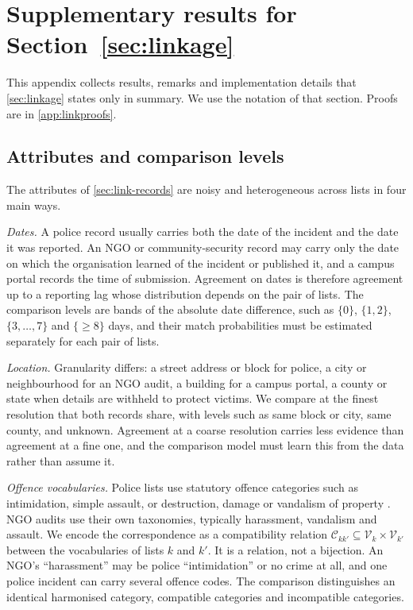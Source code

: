 \section{Supplementary results for Section~\ref{sec:linkage}}\label{app:linkdetails}

This appendix collects results, remarks and implementation details that \cref{sec:linkage} states only in summary. We use the notation of that section. Proofs are in \cref{app:linkproofs}.

\subsection{Attributes and comparison levels}\label{app:link-attributes}

The attributes of \cref{sec:link-records} are noisy and heterogeneous across lists in four main ways.

\emph{Dates.} A police record usually carries both the date of the incident and the date it was reported. An NGO or community-security record may carry only the date on which the organisation learned of the incident or published it, and a campus portal records the time of submission. Agreement on dates is therefore agreement up to a reporting lag whose distribution depends on the pair of lists. The comparison levels are bands of the absolute date difference, such as $\{0\}$, $\{1,2\}$, $\{3,\dots,7\}$ and $\{\ge8\}$ days, and their match probabilities must be estimated separately for each pair of lists.

\emph{Location.} Granularity differs: a street address or block for police, a city or neighbourhood for an NGO audit, a building for a campus portal, a county or state when details are withheld to protect victims. We compare at the finest resolution that both records share, with levels such as same block or city, same county, and unknown. Agreement at a coarse resolution carries less evidence than agreement at a fine one, and the comparison model must learn this from the data rather than assume it.

\emph{Offence vocabularies.} Police lists use statutory offence categories such as intimidation, simple assault, or destruction, damage or vandalism of property \citep{fbimanual}. NGO audits use their own taxonomies, typically harassment, vandalism and assault. We encode the correspondence as a compatibility relation $\mathcal C_{kk'}\subseteq\mathcal V_k\times\mathcal V_{k'}$ between the vocabularies of lists $k$ and $k'$. It is a relation, not a bijection. An NGO's ``harassment'' may be police ``intimidation'' or no crime at all, and one police incident can carry several offence codes. The comparison distinguishes an identical harmonised category, compatible categories and incompatible categories.

